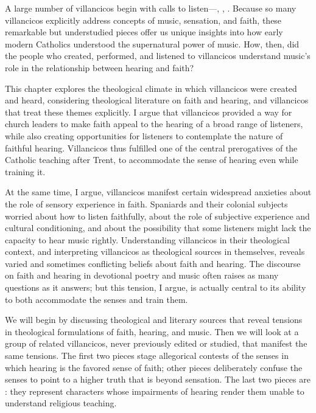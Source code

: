 A large number of villancicos begin with calls to listen---, 
, .
Because so many villancicos explicitly address concepts of music, sensation, 
and faith, these remarkable but understudied pieces offer us unique insights 
into how early modern Catholics understood the supernatural power of music.
How, then, did the people who created, performed, and listened to villancicos 
understand music's role in the relationship between hearing and faith?

This chapter explores the theological climate in which villancicos were created 
and heard, considering theological literature on faith and hearing, and 
villancicos that treat these themes explicitly.
I argue that villancicos provided a way for church leaders to make faith appeal 
to the hearing of a broad range of listeners, while also creating opportunities 
for listeners to contemplate the nature of faithful hearing.
Villancicos thus fulfilled one of the central prerogatives of the Catholic 
teaching after Trent, to accommodate the sense of hearing even while training 
it.

At the same time, I argue, villancicos manifest certain widespread anxieties 
about the role of sensory experience in faith. 
Spaniards and their colonial subjects worried about how to listen faithfully, 
about the role of subjective experience and cultural conditioning, and about 
the possibility that some listeners might lack the capacity to hear music 
rightly.
Understanding villancicos in their theological context, and interpreting 
villancicos as theological sources in themselves, reveals varied and sometimes 
conflicting beliefs about faith and hearing.
The discourse on faith and hearing in devotional poetry and music often raises 
as many questions as it answers; but this tension, I argue, is actually central 
to its ability to both accommodate the senses and train them.

We will begin by discussing theological and literary sources that reveal 
tensions in theological formulations of faith, hearing, and music.
Then we will look at a group of related villancicos, never previously edited or 
studied, that manifest the same tensions.
The first two pieces stage allegorical contests of the senses in which hearing 
is the favored sense of faith; other pieces deliberately confuse the senses to 
point to a higher truth that is beyond sensation.
The last two pieces are : they represent 
characters whose impairments of hearing render them unable to understand 
religious teaching.

